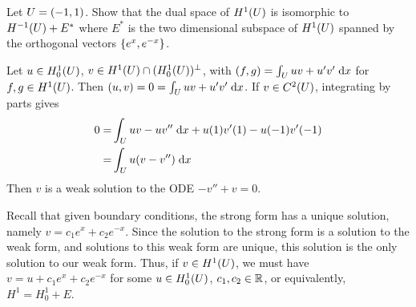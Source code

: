 Let $U = (-1, 1)$.
Show that the dual space of $H^1(U)$ is isomorphic to $H^{-1}(U) + E^*$
where $E^*$ is the two dimensional subspace of $H^1(U)$ spanned by the orthogonal vectors $\{ e^x, e^{-x} \}$.

Let $u \in H_0^1(U)$, $v \in H^1(U) \cap (H_0^1(U))^{\perp}$,
with $(f, g) = \int_U u v + u' v' \;\mathrm{d}x$ for $f, g \in H^1(U)$.
Then $(u, v) = 0 = \int_U u v + u' v' \;\mathrm{d}x$.
If $v \in C^2(U)$, integrating by parts gives
\begin{align*}
  0 = &\int_U u v - u v'' \;\mathrm{d}x + u(1) v'(1) - u(-1) v'(-1)\\
    = &\int_U u (v - v'') \;\mathrm{d}x
\end{align*}
Then $v$ is a weak solution to the ODE $-v'' + v = 0$.

Recall that given boundary conditions, the strong form has a unique solution,
namely $v = c_1 e^x + c_2 e^{-x}$.
Since the solution to the strong form is a solution to the weak form,
and solutions to this weak form are unique, this solution is the only solution to our weak form.
Thus, if $v \in H^1(U)$, we must have $v = u + c_1 e^x + c_2 e^{-x}$ for some $u \in H_0^1(U)$,
$c_1, c_2 \in \mathbb{R}$, or equivalently, $H^1 = H_0^1 + E$.

